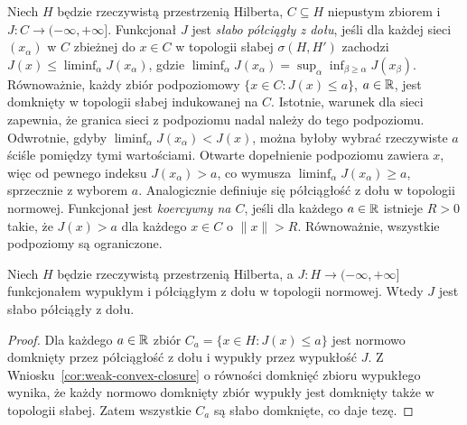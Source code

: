 \begin{definicja}
\label{def:weak-lsc16}
Niech $H$ będzie rzeczywistą przestrzenią Hilberta,
$C\subseteq H$ niepustym zbiorem i $J:C\to(-\infty,+\infty]$.
Funkcjonał $J$ jest \emph{słabo półciągły z dołu}, jeśli dla każdej sieci
$(x_\alpha)$ w $C$ zbieżnej do $x\in C$ w topologii
słabej $\sigma(H,H')$ zachodzi
$J(x)\le\liminf_\alpha J(x_\alpha)$, gdzie
$\liminf_\alpha J(x_\alpha)=
\sup_\alpha\inf_{\beta\ge\alpha}J(x_\beta)$.
Równoważnie, każdy zbiór podpoziomowy
$\{x\in C:J(x)\le a\}$, $a\in\mathbb R$, jest domknięty
w topologii słabej indukowanej na $C$.
Istotnie, warunek dla sieci zapewnia, że granica sieci
z podpoziomu nadal należy do tego podpoziomu.
Odwrotnie, gdyby $\liminf_\alpha J(x_\alpha)<J(x)$,
można byłoby wybrać rzeczywiste $a$ ściśle pomiędzy
tymi wartościami. Otwarte dopełnienie podpoziomu
zawiera $x$, więc od pewnego indeksu $J(x_\alpha)>a$,
co wymusza $\liminf_\alpha J(x_\alpha)\ge a$,
sprzecznie z wyborem $a$.
Analogicznie definiuje się półciągłość z dołu
w topologii normowej.
Funkcjonał jest \emph{koercywny na $C$}, jeśli dla
każdego $a\in\mathbb R$ istnieje $R>0$ takie, że
$J(x)>a$ dla każdego $x\in C$ o $\|x\|>R$.
Równoważnie, wszystkie podpoziomy są ograniczone.
\end{definicja}

\begin{lemat}
\label{lem:convex-weaklsc16}
Niech $H$ będzie rzeczywistą przestrzenią Hilberta,
a $J:H\to(-\infty,+\infty]$ funkcjonałem wypukłym
i półciągłym z dołu w topologii normowej.
Wtedy $J$ jest słabo półciągły z dołu.
\end{lemat}
\begin{proof}
Dla każdego $a\in\mathbb R$ zbiór $C_a=\{x\in H:J(x)\le a\}$
jest normowo domknięty przez półciągłość z dołu
i wypukły przez wypukłość $J$. Z Wniosku~\ref{cor:weak-convex-closure}
o równości domknięć zbioru wypukłego wynika,
że każdy normowo domknięty zbiór wypukły jest
domknięty także w topologii słabej. Zatem wszystkie $C_a$
są słabo domknięte, co daje tezę.
\end{proof}

